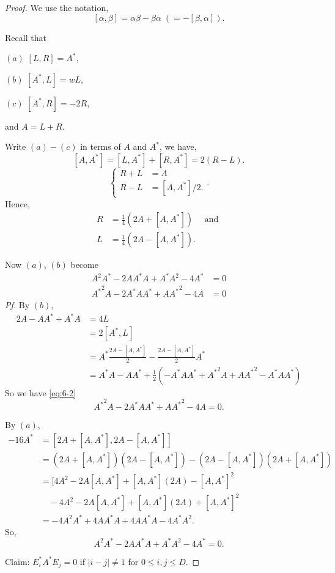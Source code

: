 \documentclass[
]{book}
\theoremstyle{definition}
\theoremstyle{definition}
\theoremstyle{definition}
\theoremstyle{definition}
\theoremstyle{remark}
\begin{document}
\begin{proof}
We use the notation,
\[[\alpha, \beta] = \alpha\beta - \beta\alpha \; (=-[\beta, \alpha]).\]

Recall that

\((a)\) \([L, R] = A^*\),

\((b)\) \([A^*, L] = wL\),

\((c)\) \([A^*, R] = -2R\),

and \(A = L + R\).

Write \((a) - (c)\) in terms of \(A\) and \(A^*\), we have,
\[[A, A^*] = [L, A^*]+ [R, A^*] = 2(R-L).\]
\[\begin{cases} R + L & = A\\
R-L & = [A,A^*]/2. \end{cases}.\]
Hence,
\begin{align}
R & = \frac{1}{4}(2A + [A, A^*]) \quad \text{ and }\\
L & = \frac{1}{4}(2A - [A, A^*]).
\end{align}

Now \((a)\), \((b)\) become
\begin{align}
A^2A^* - 2AA^*A + A^*A^2 - 4A^*  & = 0  \label{eq:6-1}\\
{A^*}^2A - 2A^*AA^* + A{A^*}^2 - 4A  & = 0 \label{eq:6-2}
\end{align}
\emph{Pf.} \quad By \((b)\),
\begin{align}
2A - AA^* + A^*A & = 4L\\
& = 2[A^*, L]\\
& = A^* \frac{2A - [A,A^*]}{2} - \frac{2A - [A, A^*]}{2}A^*\\
& = A^*A-AA^* + \frac12(-A^*AA^* + {A^*}^2A + A{A^*}^2 - A^*AA^*)
\end{align}
So we have \eqref{eq:6-2}
\[
{A^*}^2A - 2A^*AA^* + A{A^*}^2 - 4A   = 0.
\]

By \((a)\),
\begin{align}
-16A^* & = [2A + [A, A^*], 2A - [A, A^*]]\\
& = (2A + [A, A^*])(2A - [A, A^*]) - (2A - [A,A^*])(2A + [A, A^*])\\
& = [4A^2 - 2A[A, A^*] + [A, A^*](2A) - [A,A^*]^2\\
& \quad - 4A^2 - 2A[A, A^*] + [A, A^*](2A) + [A, A^*]^2\\
& = -4A^2A^* + 4AA^*A + 4AA^*A - 4A^*A^2.
\end{align}
So,
\[A^2A^* - 2AA^*A + A^*A^2 - 4A^* = 0.\]

Claim: \(E_i^*A^*E_j = 0\) if \(|i-j| \neq 1\) for \(0\leq i, j\leq D\).


\end{proof}
\end{document}
